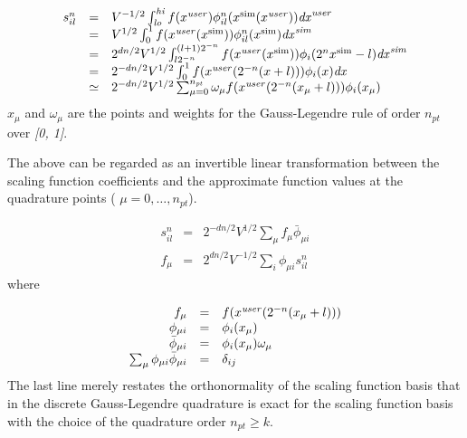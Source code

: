 \documentclass[letterpaper]{book}
\begin{document}
\begin{equation}
\begin{matrix}s_{il}^{n}&\text{=}&V^{-1/2}\int
_{\mathrm{{\mathit{lo}}}}^{\mathrm{{\mathit{hi}}}}{f(x^{\mathrm{{\mathit{user}}}})\phi
_{il}^{n}(x^{\mathrm{{sim}}}(x^{\mathrm{{\mathit{user}}}}))\mathit{dx}^{\mathrm{{\mathit{user}}}}}\hfill\null
\\&\text{=}&V^{1/2}\int _{0}^{1}{f(x^{\mathrm{{\mathit{user}}}}(x^{\mathrm{{sim}}}))\phi
_{il}^{n}(x^{\mathrm{{sim}}})\mathit{dx}^{\mathrm{{\mathit{sim}}}}}\hfill\null \\&\text{=}&2^{dn/2}V^{1/2}\int
_{l2^{-n}}^{(l+1)2^{-n}}{f(x^{\mathrm{{\mathit{user}}}}(x^{\mathrm{{sim}}}))\phi
_{i}(2^{n}x^{\mathrm{{sim}}}-l)\mathit{dx}^{\mathrm{{\mathit{sim}}}}}\hfill\null \\&\text{=}&2^{-dn/2}V^{1/2}\int
_{0}^{1}{f(x^{\mathrm{{\mathit{user}}}}(2^{-n}(x+l)))\phi _{i}(x)\mathit{dx}}\hfill\null \\&\simeq
&2^{-dn/2}V^{1/2}\sum _{\mu =0}^{n_{\mathrm{{\mathit{pt}}}}}{\omega _{\mu }f(x^{\mathrm{{\mathit{user}}}}(2^{-n}(x_{\mu
}+l)))\phi _{i}(x_{\mu })}\hfill\null \end{matrix}
\end{equation}
 $x_{\mu }$ and  $\omega _{\mu }$ are the points and weights for the Gauss-Legendre rule of order 
$n_{\mathrm{{\mathit{pt}}}}$ over \textit{[0, 1]}.

The above can be regarded as an invertible linear transformation between the scaling function coefficients and the
approximate function values at the quadrature points ( $\mu =0,\ldots ,n_{\mathrm{{\mathit{pt}}}}$). 

\begin{equation}\label{seq:refText21}
\begin{matrix}s_{il}^{n}&\text{=}&2^{-dn/2}V^{1/2}\sum _{\mu }f_{\mu }{\bar{\phi }}_{\mu i}\\f_{\mu
}&\text{=}&2^{dn/2}V^{-1/2}\sum _{i}\phi _{\mu i}s_{il}^{n}\end{matrix}
\end{equation}
where 

\begin{equation}
\begin{matrix}\hfill f_{\mu }&\text{=}&f(x^{\mathrm{{\mathit{user}}}}(2^{-n}(x_{\mu }+l)))\hfill\null \\\hfill \phi
_{\mu i}&\text{=}&\phi _{i}(x_{\mu })\hfill\null \\\hfill {\bar{\phi }}_{\mu i}&\text{=}&\phi _{i}(x_{\mu })\omega
_{\mu }\hfill\null \\\hfill \sum _{\mu }\phi _{\mu i}{\bar{\phi }}_{\mu i}&\text{=}&\delta _{ij}\hfill\null
\end{matrix}
\end{equation}
The last line merely restates the orthonormality of the scaling function basis that in the discrete Gauss-Legendre
quadrature is exact for the scaling function basis with the choice of the quadrature order 
$n_{\mathrm{{\mathit{pt}}}}\ge k$.
\end{document}

